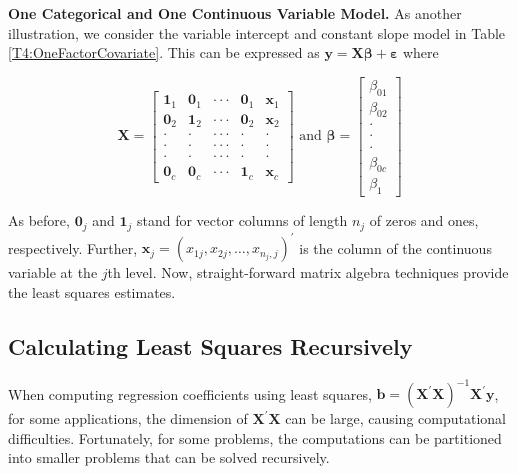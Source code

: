 \textbf{One Categorical and One Continuous Variable Model.} As
another illustration, we consider the variable intercept and
constant slope model in Table \ref{T4:OneFactorCovariate}. This can
be expressed as $\mathbf{y}= \mathbf{X \boldsymbol \beta +
\boldsymbol \varepsilon}$ where

\begin{equation}\label{E4:CategoricalContinuous}
\mathbf{X}=%
\begin{bmatrix}
\mathbf{1}_1 & \mathbf{0}_1 & \cdot \cdot \cdot  & \mathbf{0}%
_1 & \mathbf{x}_1 \\
\mathbf{0}_2 & \mathbf{1}_2 & \cdot \cdot \cdot  & \mathbf{0}%
_2 & \mathbf{x}_2 \\
\cdot  & \cdot  & \cdot \cdot \cdot  & \cdot  & \cdot  \\
\cdot  & \cdot  & \cdot \cdot \cdot  & \cdot  & \cdot  \\
\cdot  & \cdot  & \cdot \cdot \cdot  & \cdot  & \cdot  \\
\mathbf{0}_{c} & \mathbf{0}_{c} & \cdot \cdot \cdot  & \mathbf{1}_c & \mathbf{x}_{c}%
\end{bmatrix}%
\text{ \ \ \ \ and \ \ \ }\boldsymbol \beta=
\begin{bmatrix}
\beta_{01} \\
\beta_{02} \\
\cdot  \\
\cdot  \\
\cdot  \\
\beta_{0c} \\
\beta_1%
\end{bmatrix}
\end{equation}

\noindent As before, $\mathbf{0}_j$ and $\mathbf{1}_j$ stand for
vector columns of length $n_j$ of zeros and ones, respectively.
Further, $\mathbf{x}_j=(x_{1j},x_{2j},\ldots,x_{n_j,j})^{\prime}$ is
the column of the continuous variable at the $j$th level. Now,
straight-forward matrix algebra techniques provide the least squares
estimates.

\subsection{Calculating Least Squares Recursively}\label{S4:MatrixSuccess}

When computing regression coefficients using least squares,
$\mathbf{b} = \left( \mathbf{X}^{\prime}\mathbf{X}\right)^{-1}
\mathbf{X}^{\prime}\mathbf{y}$, for some applications, the dimension
of $\mathbf{X}^{\prime}\mathbf{X}$ can be large, causing
computational difficulties. Fortunately, for some problems, the
computations can be partitioned into smaller problems that can be
solved recursively.

